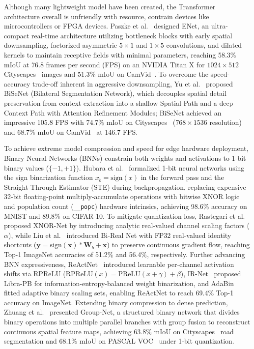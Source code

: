 \documentclass[a4paper]{report}
\begin{document}
Although many lightweight model have been created, the Transformer architecture overall is unfriendly with resource, contrain devices like microcontrollers or FPGA devices. Paszke et al.~\cite{paszke2016enet} designed ENet, an ultra-compact real-time architecture utilizing bottleneck blocks with early spatial downsampling, factorized asymmetric $5\times1$ and $1\times5$ convolutions, and dilated kernels to maintain receptive fields with minimal parameters, reaching 58.3\% mIoU at 76.8 frames per second (FPS) on an NVIDIA Titan X for $1024\times512$ Cityscapes~\cite{cordts2016cityscapes} images and 51.3\% mIoU on CamVid~\cite{brostow2009camvid}. To overcome the speed-accuracy trade-off inherent in aggressive downsampling, Yu et al.~\cite{yu2018bisenet} proposed BiSeNet (Bilateral Segmentation Network), which decouples spatial detail preservation from context extraction into a shallow Spatial Path and a deep Context Path with Attention Refinement Modules; BiSeNet achieved an impressive 105.8 FPS with 74.7\% mIoU on Cityscapes~\cite{cordts2016cityscapes} ($768\times1536$ resolution) and 68.7\% mIoU on CamVid~\cite{brostow2009camvid} at 146.7 FPS.

To achieve extreme model compression and speed for edge hardware deployment, Binary Neural Networks (BNNs) constrain both weights and activations to 1-bit binary values ($\{-1, +1\}$). Hubara et al.~\cite{hubara2016binarized} formalized 1-bit neural networks using the sign binarization function $x_b = \text{sign}(x)$ in the forward pass and the Straight-Through Estimator (STE) during backpropagation, replacing expensive 32-bit floating-point multiply-accumulate operations with bitwise XNOR logic and population count (\texttt{\_\_popc}) hardware intrinsics, achieving 98.6\% accuracy on MNIST and 89.8\% on CIFAR-10. To mitigate quantization loss, Rastegari et al.~\cite{rastegari2016xnor} proposed XNOR-Net by introducing analytic real-valued channel scaling factors ($\alpha$), while Liu et al.~\cite{qin2020bireal} introduced Bi-Real Net with FP32 real-valued identity shortcuts ($\mathbf{y} = \text{sign}(\mathbf{x}) * \mathbf{W}_b + \mathbf{x}$) to preserve continuous gradient flow, reaching Top-1 ImageNet accuracies of 51.2\% and 56.4\%, respectively. Further advancing BNN expressiveness, ReActNet~\cite{liu2020reactnet} introduced learnable per-channel activation shifts via RPReLU ($\text{RPReLU}(x) = \text{PReLU}(x + \gamma) + \beta$), IR-Net~\cite{qin2020irnet} proposed Libra-PB for information-entropy-balanced weight binarization, and AdaBin~\cite{tu2022adabin} fitted adaptive binary scaling sets, enabling ReActNet to reach 69.4\% Top-1 accuracy on ImageNet. Extending binary compression to dense prediction, Zhuang et al.~\cite{zhuang2019structured} presented Group-Net, a structured binary network that divides binary operations into multiple parallel branches with group fusion to reconstruct continuous spatial feature maps, achieving 63.8\% mIoU on Cityscapes~\cite{cordts2016cityscapes} road segmentation and 68.1\% mIoU on PASCAL VOC~\cite{everingham2012pascal} under 1-bit quantization.
\end{document}
